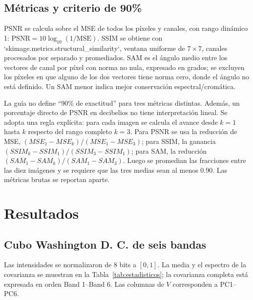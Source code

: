 \documentclass[11pt,a4paper]{article}
\begin{document}
\subsection{Métricas y criterio de 90\%}
PSNR se calcula sobre el MSE de todos los píxeles y canales, con rango dinámico 1: $\mathrm{PSNR}=10\log_{10}(1/\mathrm{MSE})$. SSIM se obtiene con `skimage.metrics.structural\_similarity`, ventana uniforme de $7\times7$, canales procesados por separado y promediados. SAM es el ángulo medio entre los vectores de canal por píxel con norma no nula, expresado en grados; se excluyen los píxeles en que alguno de los dos vectores tiene norma cero, donde el ángulo no está definido. Un SAM menor indica mejor conservación espectral/cromática.

La guía no define “90\% de exactitud” para tres métricas distintas. Además, un porcentaje directo de PSNR en decibelios no tiene interpretación lineal. Se adopta una regla explícita: para cada imagen se calcula el avance desde $k=1$ hasta $k$ respecto del rango completo $k=3$. Para PSNR se usa la reducción de MSE, $(MSE_1-MSE_k)/(MSE_1-MSE_3)$; para SSIM, la ganancia $(SSIM_k-SSIM_1)/(SSIM_3-SSIM_1)$; para SAM, la reducción $(SAM_1-SAM_k)/(SAM_1-SAM_3)$. Luego se promedian las fracciones entre las diez imágenes y se requiere que las tres medias sean al menos 0.90. Las métricas brutas se reportan aparte.

\section{Resultados}
\subsection{Cubo Washington D. C. de seis bandas}
Las intensidades se normalizaron de 8 bits a $[0,1]$. La media y el espectro de la covarianza se muestran en la Tabla~\ref{tab:estadisticos}; la covarianza completa está expresada en orden Band 1--Band 6. Las columnas de $V$ corresponden a PC1--PC6.
\end{document}
